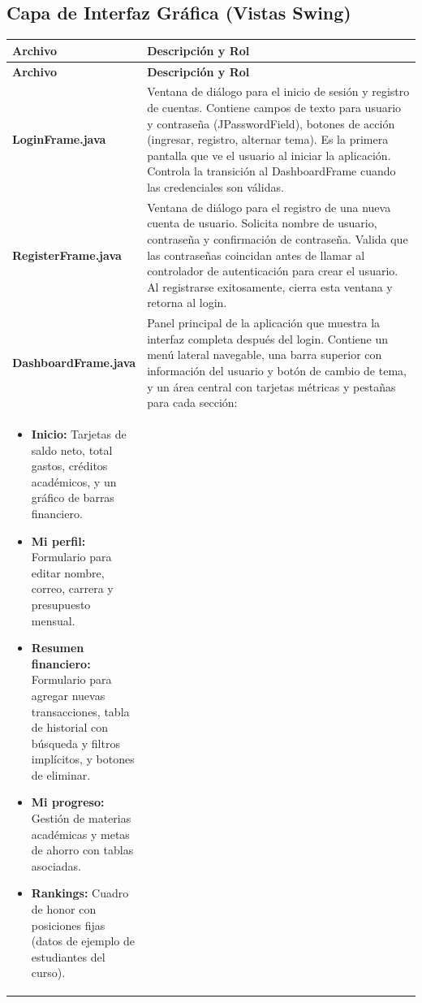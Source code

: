 \documentclass[utf8]{article}
\begin{document}
\subsection*{Capa de Interfaz Gráfica (Vistas Swing)}

\begin{longtable}{p{0.15\linewidth}p{0.85\linewidth}}
\hline
\textbf{Archivo} & \textbf{Descripción y Rol} \\ \hline
\endfirsthead
\hline
\textbf{Archivo} & \textbf{Descripción y Rol} \\ \hline
\endhead
\hline
\endfoot
\hline
\endlastfoot
\textbf{LoginFrame.java} & Ventana de diálogo para el inicio de sesión y registro de cuentas. Contiene campos de texto para usuario y contraseña (JPasswordField), botones de acción (ingresar, registro, alternar tema). Es la primera pantalla que ve el usuario al iniciar la aplicación. Controla la transición al DashboardFrame cuando las credenciales son válidas. \\ \hline
\textbf{RegisterFrame.java} & Ventana de diálogo para el registro de una nueva cuenta de usuario. Solicita nombre de usuario, contraseña y confirmación de contraseña. Valida que las contraseñas coincidan antes de llamar al controlador de autenticación para crear el usuario. Al registrarse exitosamente, cierra esta ventana y retorna al login. \\ \hline
\textbf{DashboardFrame.java} & Panel principal de la aplicación que muestra la interfaz completa después del login. Contiene un menú lateral navegable, una barra superior con información del usuario y botón de cambio de tema, y un área central con tarjetas métricas y pestañas para cada sección:\\
\begin{itemize}[leftmargin=*, topsep=0pt, itemsep=0.5em]
    \item \textbf{Inicio:} Tarjetas de saldo neto, total gastos, créditos académicos, y un gráfico de barras financiero.
    \item \textbf{Mi perfil:} Formulario para editar nombre, correo, carrera y presupuesto mensual.
    \item \textbf{Resumen financiero:} Formulario para agregar nuevas transacciones, tabla de historial con búsqueda y filtros implícitos, y botones de eliminar.
    \item \textbf{Mi progreso:} Gestión de materias académicas y metas de ahorro con tablas asociadas.
    \item \textbf{Rankings:} Cuadro de honor con posiciones fijas (datos de ejemplo de estudiantes del curso).

\end{itemize}
\end{longtable}
\end{document}

